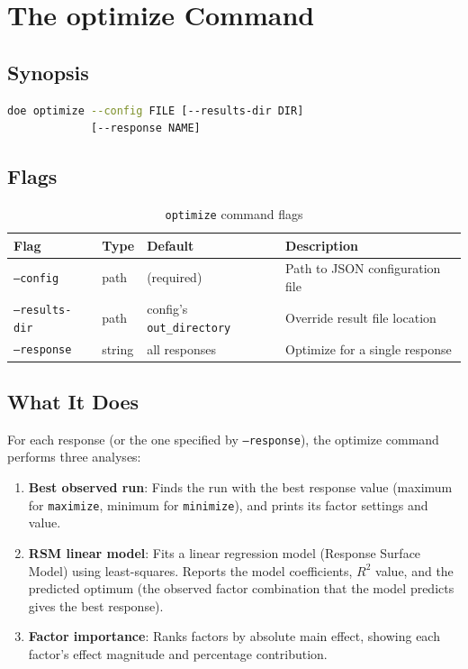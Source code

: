 \documentclass[11pt]{book}
\begin{document}
\chapter{The optimize Command}
\label{ch:optimize}

\section{Synopsis}

\begin{lstlisting}[language=bash]
doe optimize --config FILE [--results-dir DIR]
             [--response NAME]
\end{lstlisting}

\section{Flags}

\begin{table}[H]
\centering
\caption{\texttt{optimize} command flags}
\begin{tabular}{@{}lllp{4.5cm}@{}}
\toprule
\textbf{Flag} & \textbf{Type} & \textbf{Default} & \textbf{Description} \\
\midrule
\texttt{--config} & path & (required) & Path to JSON configuration file \\
\texttt{--results-dir} & path & config's \texttt{out\_directory} & Override result file location \\
\texttt{--response} & string & all responses & Optimize for a single response \\
\bottomrule
\end{tabular}
\end{table}

\section{What It Does}

For each response (or the one specified by \texttt{--response}), the optimize command performs three analyses:

\begin{enumerate}
  \item \textbf{Best observed run}: Finds the run with the best response value (maximum for \texttt{maximize}, minimum for \texttt{minimize}), and prints its factor settings and value.
  \item \textbf{RSM linear model}: Fits a linear regression model (Response Surface Model) using least-squares. Reports the model coefficients, $R^2$ value, and the predicted optimum (the observed factor combination that the model predicts gives the best response).
  \item \textbf{Factor importance}: Ranks factors by absolute main effect, showing each factor's effect magnitude and percentage contribution.
\end{enumerate}
\end{document}
